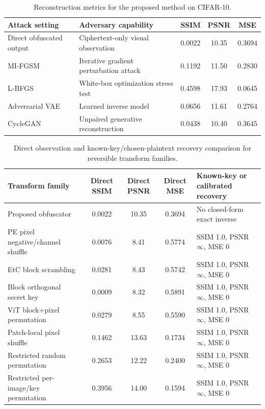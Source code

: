 \documentclass{ieeeaccess}
\newcommand{\rev}[1]{{\color{green}#1}}
\begin{document}
\begin{table}[t!]
\centering
\caption{\rev{Reconstruction metrics for the proposed method on CIFAR-10.}}
\label{tab:proposed_attack_metrics}
\begin{tabular}{p{} p{} c c c}
\toprule
\rev{\textbf{Attack setting}} & \rev{\textbf{Adversary capability}} & \rev{\textbf{SSIM}} & \rev{\textbf{PSNR}} & \rev{\textbf{MSE}} \\
\midrule
\rev{Direct obfuscated output} & \rev{Ciphertext-only visual observation} & \rev{0.0022} & \rev{10.35} & \rev{0.3694} \\
\rev{MI-FGSM} & \rev{Iterative gradient perturbation attack} & \rev{0.1192} & \rev{11.50} & \rev{0.2830} \\
\rev{L-BFGS} & \rev{White-box optimization stress test} & \rev{0.4598} & \rev{17.93} & \rev{0.0645} \\
\rev{Adversarial VAE} & \rev{Learned inverse model} & \rev{0.0656} & \rev{11.61} & \rev{0.2764} \\
\rev{CycleGAN} & \rev{Unpaired generative reconstruction} & \rev{0.0438} & \rev{10.40} & \rev{0.3645} \\
\bottomrule
\end{tabular}
\end{table}

\begin{table}[t!]
\centering
\caption{\rev{Direct observation and known-key/chosen-plaintext recovery comparison for reversible transform families.}}
\label{tab:reversible_recovery_metrics}
\begin{tabular}{p{} c c c p{}}
\toprule
\rev{\textbf{Transform family}} & \rev{\textbf{Direct SSIM}} & \rev{\textbf{Direct PSNR}} & \rev{\textbf{Direct MSE}} & \rev{\textbf{Known-key or calibrated recovery}} \\
\midrule
\rev{Proposed obfuscator} & \rev{0.0022} & \rev{10.35} & \rev{0.3694} & \rev{No closed-form exact inverse} \\
\rev{PE pixel negative/channel shuffle} & \rev{0.0076} & \rev{8.41} & \rev{0.5774} & \rev{SSIM 1.0, PSNR $\infty$, MSE 0} \\
\rev{EtC block scrambling} & \rev{0.0281} & \rev{8.43} & \rev{0.5742} & \rev{SSIM 1.0, PSNR $\infty$, MSE 0} \\
\rev{Block orthogonal secret key} & \rev{0.0009} & \rev{8.32} & \rev{0.5891} & \rev{SSIM 1.0, PSNR $\infty$, MSE 0} \\
\rev{ViT block+pixel permutation} & \rev{0.0279} & \rev{8.55} & \rev{0.5590} & \rev{SSIM 1.0, PSNR $\infty$, MSE 0} \\
\rev{Patch-local pixel shuffle} & \rev{0.1462} & \rev{13.63} & \rev{0.1734} & \rev{SSIM 1.0, PSNR $\infty$, MSE 0} \\
\rev{Restricted random permutation} & \rev{0.2653} & \rev{12.22} & \rev{0.2400} & \rev{SSIM 1.0, PSNR $\infty$, MSE 0} \\
\rev{Restricted per-image/key permutation} & \rev{0.3956} & \rev{14.00} & \rev{0.1594} & \rev{SSIM 1.0, PSNR $\infty$, MSE 0} \\
\bottomrule
\end{tabular}
\end{table}
\end{document}

